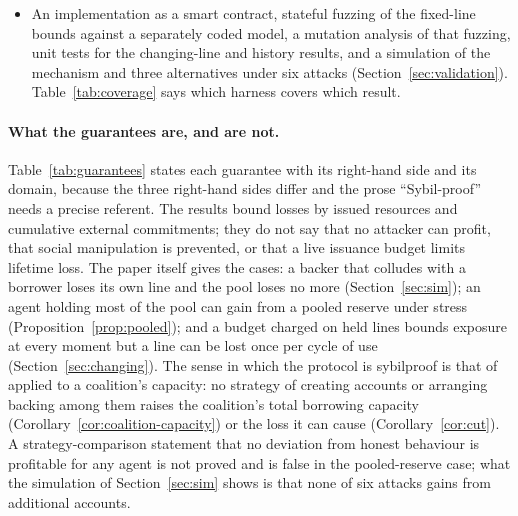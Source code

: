 \documentclass[acmsmall,nonacm,screen]{acmart}
\theoremstyle{acmdefinition}%
\begin{document}
\begin{itemize}
  surrendered can be farmed for profit linear in the number of accounts. We determine that value
  for the protocol, show that interest paid to lenders does not count when the payer can also be a
  lender (Proposition~\ref{prop:lender}), and derive a trilemma (Corollary~\ref{cor:trilemma}).
\item An implementation as a smart contract, stateful fuzzing of the fixed-line bounds against a
  separately coded model, a mutation analysis of that fuzzing, unit tests for the changing-line and
  history results, and a simulation of the mechanism and three alternatives under six attacks
  (Section~\ref{sec:validation}). Table~\ref{tab:coverage} says which harness covers which result.
\end{itemize}

\paragraph{What the guarantees are, and are not.} Table~\ref{tab:guarantees} states each guarantee
with its right-hand side and its domain, because the three right-hand sides differ and the prose
``Sybil-proof'' needs a precise referent. The results bound losses by issued resources and
cumulative external commitments; they do not say that no attacker can profit, that social
manipulation is prevented, or that a live issuance budget limits lifetime loss. The paper itself
gives the cases: a backer that colludes with a borrower loses its own line and the pool loses no
more (Section~\ref{sec:sim}); an agent holding most of the pool can gain from a pooled reserve under
stress (Proposition~\ref{prop:pooled}); and a budget charged on held lines bounds exposure at every
moment but a line can be lost once per cycle of use (Section~\ref{sec:changing}). The sense in which
the protocol is sybilproof is that of \citet{cheng2005sybilproof} applied to a coalition's capacity:
no strategy of creating accounts or arranging backing among them raises the coalition's total
borrowing capacity (Corollary~\ref{cor:coalition-capacity}) or the loss it can cause
(Corollary~\ref{cor:cut}). A strategy-comparison statement that no deviation from honest behaviour is
profitable for any agent is not proved and is false in the pooled-reserve case; what the simulation
of Section~\ref{sec:sim} shows is that none of six attacks gains from additional accounts.
\end{document}
